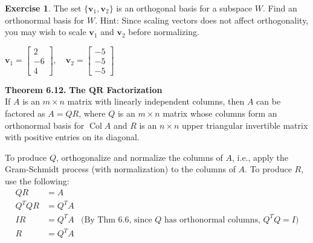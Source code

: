 \documentclass[10pt]{book}
\newcommand{\boxcolor}{gray!30}
\newenvironment{boxme}{\begin{mdframed}[backgroundcolor=\boxcolor,linewidth=0pt,nobreak=true]}{\end{mdframed}}
\newenvironment{boxthm}{\begin{mdframed}[backgroundcolor=\boxcolor,nobreak=true]}{\end{mdframed}}
\theoremstyle{definition}
\newtheorem{exercise}{Exercise}[section]
\newcommand{\vect}[1]{\ensuremath{\boldsymbol{\mathbf{#1}}}}
\DeclareMathOperator{\Col}{Col}
\begin{document}
\newpage


\begin{exercise} %
	The set $\{\vect{v}_1,\vect{v}_2\}$ is an orthogonal basis for a subspace $W$. Find an orthonormal basis for $W$. Hint: Since scaling vectors does not affect orthogonality, you may wish to scale $\vect{v}_1$ and $\vect{v}_2$ before normalizing.
	
	\vspace{1em}
	$ \vect{v}_1 = \begin{bmatrix}2\\-6\\4\end{bmatrix}, \quad
	\vect{v}_2 = \begin{bmatrix}-5\\-5\\-5\end{bmatrix} $
\end{exercise}
\vspace{1.75in}


\begin{boxthm}
	\textbf{Theorem 6.12.}
	\textbf{The $\boldsymbol{QR}$ Factorization} \\
	If $A$ is an $m\times n$ matrix with linearly independent columns, then $A$ can be factored as $A=QR$, where $Q$ is an $m\times n$ matrix whose columns form an orthonormal basis for $\Col A$ and $R$ is an $n\times n$ upper triangular invertible matrix with positive entries on its diagonal.
\end{boxthm}
\vspace{-1em}
\begin{boxme}
	To produce $Q$, orthogonalize and normalize the columns of $A$, i.e., apply the Gram-Schmidt process (with normalization) to the columns of $A$. To produce $R$, use the following:
	\vspace{-1em}
	\begin{align*}
	QR &= A \\
	Q^TQR &= Q^TA \\
	IR &= Q^TA &\text{(By Thm 6.6, since $Q$ has orthonormal columns, $Q^TQ=I$)}\\
	R &= Q^TA
	\end{align*}
\end{boxme}
\end{document}
